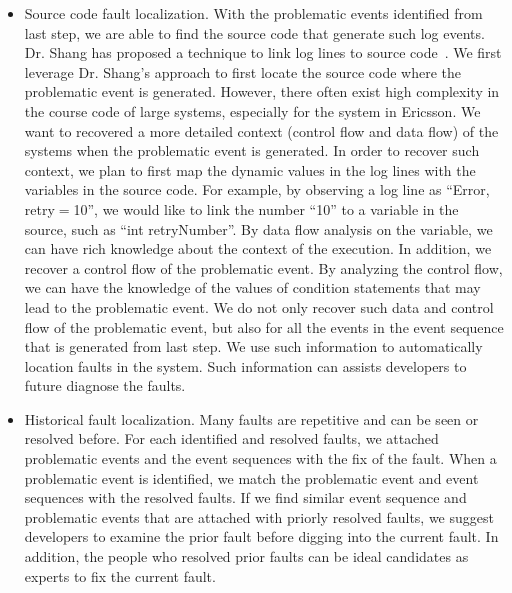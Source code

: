 \begin{enumerate}
\begin{itemize}
		\item Source code fault localization. With the problematic events identified from last step, we are able to find the source code that generate such log events. Dr. Shang has proposed a technique to link log lines to source code~\cite{Shang:2014:ULL:2705615.2706065}. We first leverage Dr. Shang's approach to first locate the source code where the problematic event is generated. However, there often exist high complexity in the course code of large systems, especially for the system in Ericsson. We want to recovered a more detailed context (control flow and data flow) of the systems when the problematic event is generated. In order to recover such context, we plan to first map the dynamic values in the log lines with the variables in the source code. For example, by observing a log line as ``Error, retry$=$10'', we would like to link the number ``10'' to a variable in the source, such as ``int retryNumber''. By data flow analysis on the variable, we can have rich knowledge about the context of the execution. In addition, we recover a control flow of the problematic event. By analyzing the control flow, we can have the knowledge of the values of condition statements that may lead to the problematic event. We do not only recover such data and control flow of the problematic event, but also for all the events in the event sequence that is generated from last step. We use such information to automatically location faults in the system. Such information can assists developers to future diagnose the faults.
		
		\item Historical fault localization. Many faults are repetitive and can be seen or resolved before. For each identified and resolved faults, we attached problematic events and the event sequences with the fix of the fault. When a problematic event is identified, we match the problematic event and event sequences with the resolved faults. If we find similar event sequence and problematic events that are attached with priorly resolved faults, we suggest developers to examine the prior fault before digging into the current fault. In addition, the people who resolved prior faults can be ideal candidates as experts to fix the current fault.
		
	\end{itemize}
\end{enumerate}

